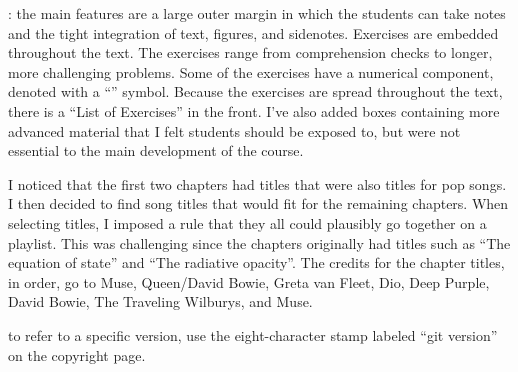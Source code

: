 : the main features are a large outer margin in which the students can take notes and the tight integration of text, figures, and sidenotes. Exercises are embedded throughout the text. The exercises range from comprehension checks to longer, more challenging problems. Some of the exercises have a numerical component, denoted with a ``\notebook'' symbol. Because the exercises are spread throughout the text, there is a ``List of Exercises'' in the front. I've also added boxes containing more advanced material that I felt students should be exposed to, but were not essential to the main development of the course. 

 I noticed that the first two chapters had titles that were also titles for pop songs. I then decided to find song titles that would fit for the remaining chapters. When selecting titles, I imposed a rule that they all could plausibly go together on a playlist. This was challenging since the chapters originally had titles such as ``The equation of state'' and ``The radiative opacity''. The credits for the chapter titles, in order, go to Muse, Queen/David Bowie, Greta van Fleet, Dio, Deep Purple, David Bowie, The Traveling Wilburys, and Muse.

 to refer to a specific version, use the eight-character stamp labeled ``git version'' on the copyright page.
